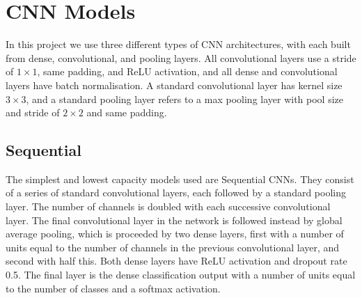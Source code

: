 \documentclass[12pt]{article}
\begin{document}
\section{CNN Models}
In this project we use three different types of CNN architectures, with each built from dense, convolutional, and pooling layers. All convolutional layers use a stride of $1\times1$, same padding, and ReLU activation, and all dense and convolutional layers have batch normalisation. A standard convolutional layer has kernel size $3\times3$, and a standard pooling layer refers to a max pooling layer with pool size and stride of $2\times2$ and same padding.

\subsection{Sequential}
The simplest and lowest capacity models used are Sequential CNNs. They consist of a series of standard convolutional layers, each followed by a standard pooling layer. The number of channels is doubled with each successive convolutional layer. The final convolutional layer in the network is followed instead by global average pooling, which is proceeded by two dense layers, first with a number of units equal to the number of channels in the previous convolutional layer, and second with half this. Both dense layers have ReLU activation and dropout rate 0.5. The final layer is the dense classification output with a number of units equal to the number of classes and a softmax activation.
\end{document}
